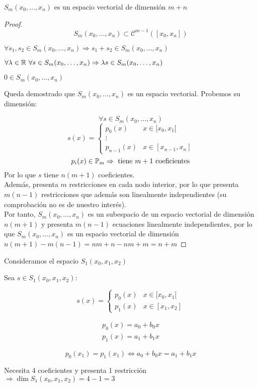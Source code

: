 \bigskip
\begin{teo}
    $S_m(x_0, \ldots, x_n)$ es un espacio vectorial de dimensión $m+n$
\end{teo}
\begin{proof}
    $$S_m(x_0, \ldots, x_n) \subset \mathcal{C}^{m-1}([x_0,x_n])$$

    $\forall s_1, s_2 \in S_m(x_0, \ldots, x_n) \Rightarrow s_1 + s_2 \in S_m(x_0, \ldots, x_n)$\par
    $\forall \lambda \in \mathbb R~\forall s \in S_m(x_0, \ldots, x_n) \Rightarrow \lambda s \in S_m(x_0,
        \ldots, x_n)$\par
    $0 \in S_m(x_0, \ldots, x_n)$

    \noindent
    Queda demostrado que $S_m(x_0, \ldots, x_n)$ es un espacio vectorial. Probemos su dimensión:

    $$\forall s \in S_m(x_0, \ldots, x_n)$$
    $$s(x) = \left\{ \begin{array}{ll}
            p_0(x)     & x \in [x_0, x_1[     \\
            \vdots                            \\
            p_{n-1}(x) & x \in [x_{n-1}, x_n]
        \end{array}\right.$$
    $$p_i(x) \in \mathbb{P}_m \Rightarrow \mbox{ tiene } m + 1 \mbox{ coeficientes}$$
    Por lo que $s$ tiene $n(m+1)$ coeficientes.\\

    \noindent
    Además, presenta $m$ restricciones en cada nodo interior, por lo que presenta $m(n-1)$
    restricciones que además son linealmente independientes (su comprobación no es de nuestro
    interés).\\

    \noindent
    Por tanto, $S_m(x_0, \ldots, x_n)$ es un subespacio de un espacio vectorial de dimensión $n(m+1)$
    y presenta $m(n-1)$ ecuaciones linealmente independientes, por lo que $S_m(x_0, \ldots, x_n)$
    es un espacio vectorial de dimensión $n(m+1)-m(n-1) = nm + n - nm + m = n + m$
\end{proof}

\begin{ejemplo}
    Consideramos el espacio $S_1(x_0, x_1, x_2)$

Sea $s \in S_1(x_0, x_1, x_2)$:

$$s(x) = \left\{\begin{array}{ll}
        p_0(x) & x \in [x_0, x_1[ \\
        p_1(x) & x \in [x_1, x_2]
    \end{array}\right.$$

$$\begin{array}{l}
        p_0(x) = a_0 + b_0x \\
        p_1(x) = a_1 + b_1x
    \end{array}$$

$$p_0(x_1)=p_1(x_1) \Leftrightarrow a_0 + b_0x = a_1 + b_1x$$

\noindent
Necesita 4 coeficientes y presenta 1 restricción $\Rightarrow \dim S_1(x_0, x_1, x_2) = 4-1=3$
\end{ejemplo}

